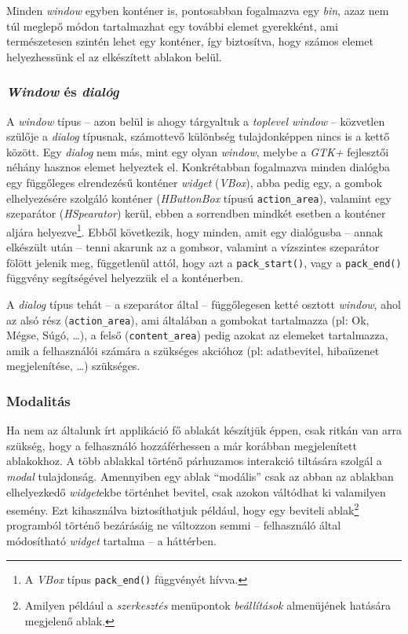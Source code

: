 Minden \textit{window} egyben konténer is, pontosabban fogalmazva egy \textit{bin}, azaz nem túl meglepő módon tartalmazhat egy további elemet gyerekként, ami természetesen szintén lehet egy konténer, így biztosítva, hogy számos elemet helyezhessünk el az elkészített ablakon belül.

\subsubsection{\textit{Window} és \textit{dialóg}}

A \textit{window} típus -- azon belül is ahogy tárgyaltuk a \textit{toplevel window} -- közvetlen szülője a \textit{dialog} típusnak, számottevő különbség tulajdonképpen nincs is a kettő között. Egy \textit{dialog} nem más, mint egy olyan \textit{window}, melybe a \textit{GTK+} fejlesztői néhány hasznos elemet helyeztek el. Konkrétabban fogalmazva minden dialógba egy függőleges elrendezésű konténer \textit{widget} (\textit{VBox}), abba pedig egy, a gombok elhelyezésére szolgáló konténer (\textit{HButtonBox} típusú \texttt{action\_area}), valamint egy szeparátor (\textit{HSpearator}) kerül, ebben a sorrendben mindkét esetben a konténer aljára helyezve\footnote{A \textit{VBox} típus \texttt{pack\_end()} függvényét hívva.}. Ebből következik, hogy minden, amit egy dialógusba -- annak elkészült után -- tenni akarunk az a gombsor, valamint a vízszintes szeparátor fölött jelenik meg, függetlenül attól, hogy azt a \texttt{pack\_start()}, vagy a \texttt{pack\_end()} függvény segítségével helyezzük el a konténerben.

A \textit{dialog} típus tehát -- a szeparátor által -- függőlegesen ketté osztott \textit{window}, ahol az alsó rész (\texttt{action\_area}), ami általában a gombokat tartalmazza (pl: Ok, Mégse, Súgó, \dots), a felső (\texttt{content\_area}) pedig azokat az elemeket tartalmazza, amik a felhasználói számára a szükséges akcióhoz (pl: adatbevitel, hibaüzenet megjelenítése, \dots) szükséges.

\subsubsection{Modalitás}

Ha nem az általunk írt applikáció fő ablakát készítjük éppen, csak ritkán van arra szükség, hogy a felhasználó hozzáférhessen a már korábban megjelenített ablakokhoz. A több ablakkal történő párhuzamos interakció tiltására szolgál a \textit{modal} tulajdonság. Amennyiben egy ablak ``modális'' csak az abban az ablakban elhelyezkedő \textit{widget}ekbe történhet bevitel, csak azokon váltódhat ki valamilyen esemény. Ezt kihasználva biztosíthatjuk például, hogy egy beviteli ablak\footnote{Amilyen például a \textit{szerkesztés} menüpontok \textit{beállítások} almenüjének hatására megjelenő ablak.} programból történő bezárásáig ne változzon semmi -- felhasználó által módosítható \textit{widget} tartalma -- a háttérben.

